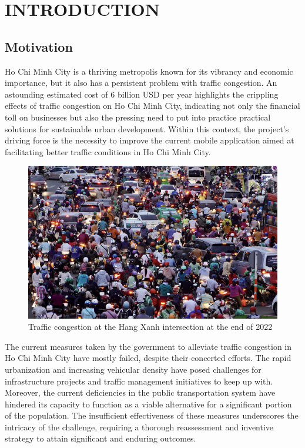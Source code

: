 %
%
\section{INTRODUCTION}

\subsection{Motivation}

Ho Chi Minh City is a thriving metropolis known for its vibrancy and economic importance, but it also has a persistent problem with traffic congestion. An astounding estimated cost of 6 billion USD per year \cite{congestion-damage} highlights the crippling effects of traffic congestion on Ho Chi Minh City, indicating not only the financial toll on businesses but also the pressing need to put into practice practical solutions for sustainable urban development. Within this context, the project's driving force is the necessity to improve the current mobile application aimed at facilitating better traffic conditions in Ho Chi Minh City. \cite{utraffic-mobile}

\begin{figure}[H]
    \includegraphics[width=\textwidth]{assets/images/Trivia/Ket_xe.jpg}
    \caption{Traffic congestion at the Hang Xanh intersection at the end of 2022}
    \label{fig:ket_xe}
\end{figure}

The current measures taken by the government to alleviate traffic congestion in Ho Chi Minh City have mostly failed, despite their concerted efforts. The rapid urbanization and increasing vehicular density have posed challenges for infrastructure projects and traffic management initiatives to keep up with. Moreover, the current deficiencies in the public transportation system have hindered its capacity to function as a viable alternative for a significant portion of the population. The insufficient effectiveness of these measures underscores the intricacy of the challenge, requiring a thorough reassessment and inventive strategy to attain significant and enduring outcomes.

